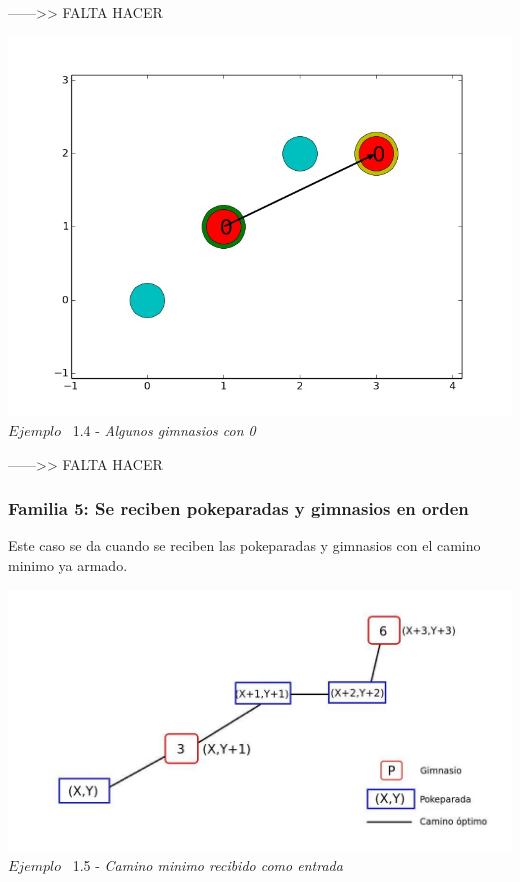 ------>> FALTA HACER
\vspace*{0.3cm} \vspace*{0.3cm}
  \begin{center}
 \includegraphics[scale=0.6]{./EJ1/gym0.jpeg}
\\ {$Ejemplo$ \ 1.4 - \textit{Algunos gimnasios con 0}}
  \end{center}
  \vspace*{0.3cm}
------>> FALTA HACER\\

\begin{center}
  \subsubsection*{Familia 5: Se reciben pokeparadas y gimnasios en orden}
\end{center}

Este caso se da cuando se reciben las pokeparadas y gimnasios con el camino minimo ya armado.

\vspace*{0.3cm} \vspace*{0.3cm}
  \begin{center}
 \includegraphics[scale=0.6]{./EJ1/optima.jpeg}
\\ {$Ejemplo$ \ 1.5 - \textit{Camino minimo recibido como entrada}}
  \end{center}
  \vspace*{0.3cm}


